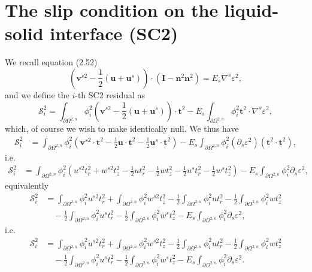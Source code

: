 \documentclass{article}
\begin{document}
\section{The slip condition on the liquid-solid interface (SC2)} %
We recall equation (2.52)
\begin{equation}
\left( \mathbf{v}^{s2} - \frac{1}{2} (\mathbf{u} + \mathbf{u}^s) \right) \cdot (\mathbf{I} - \mathbf{n}^2 \mathbf{n}^2) = E_s \nabla^s \varepsilon^2, \tag{7.1}
\end{equation}
and we define the $i$-th SC2 residual as
\begin{equation}
\mathcal{S}_i^2 = \int_{\partial \Omega^{2,n}} \phi_i^2 \left( \mathbf{v}^{s2} - \frac{1}{2} (\mathbf{u} + \mathbf{u}^s) \right) \cdot \mathbf{t}^2 - E_s \int_{\partial \Omega^{2,n}} \phi_i^2 \mathbf{t}^2 \cdot \nabla^s \varepsilon^2, \tag{7.2}
\end{equation}
which, of course we wish to make identically null.
We thus have
\begin{align}
\mathcal{S}_i^2 &= \int_{\partial \Omega^{2,n}} \phi_i^2 \left( \mathbf{v}^{s2} \cdot \mathbf{t}^2 - \frac{1}{2} \mathbf{u} \cdot \mathbf{t}^2 - \frac{1}{2} \mathbf{u}^s \cdot \mathbf{t}^2 \right) - E_s \int_{\partial \Omega^{2,n}} \phi_i^2 (\partial_s \varepsilon^2) (\mathbf{t}^2 \cdot \mathbf{t}^2), \tag{7.3}
\end{align}
i.e.
\begin{align}
\mathcal{S}_i^2 &= \int_{\partial \Omega^{2,n}} \phi_i^2 \left( u^{s2} t_r^2 + w^{s2} t_z^2 - \frac{1}{2} u t_r^2 - \frac{1}{2} w t_z^2 - \frac{1}{2} u^s t_r^2 - \frac{1}{2} w^s t_z^2 \right) - E_s \int_{\partial \Omega^{2,n}} \phi_i^2 \partial_s \varepsilon^2, \tag{7.4}
\end{align}
equivalently
\begin{align}
\mathcal{S}_i^2 &= \int_{\partial \Omega^{2,n}} \phi_i^2 u^{s2} t_r^2 + \int_{\partial \Omega^{2,n}} \phi_i^2 w^{s2} t_z^2 - \frac{1}{2} \int_{\partial \Omega^{2,n}} \phi_i^2 u t_r^2 - \frac{1}{2} \int_{\partial \Omega^{2,n}} \phi_i^2 w t_z^2 \nonumber\\
&\quad - \frac{1}{2} \int_{\partial \Omega^{2,n}} \phi_i^2 u^s t_r^2 - \frac{1}{2} \int_{\partial \Omega^{2,n}} \phi_i^2 w^s t_z^2 - E_s \int_{\partial \Omega^{2,n}} \phi_i^2 \partial_s \varepsilon^2, \tag{7.5}
\end{align}
i.e.
\begin{align}
\mathcal{S}_i^2 &= \int_{\partial \Omega^{2,n}} \phi_i^2 u^{s2} t_r^2 + \int_{\partial \Omega^{2,n}} \phi_i^2 w^{s2} t_z^2 - \frac{1}{2} \int_{\partial \Omega^{2,n}} \phi_i^2 u t_r^2 - \frac{1}{2} \int_{\partial \Omega^{2,n}} \phi_i^2 w t_z^2 \nonumber\\
&\quad - \frac{1}{2} \int_{\partial \Omega^{2,n}} \phi_i^2 u^s t_r^2 - \frac{1}{2} \int_{\partial \Omega^{2,n}} \phi_i^2 w^s t_z^2 - E_s \int_{\partial \Omega^{2,n}} \phi_i^2 \partial_s \varepsilon^2. \tag{7.6}
\end{align}
\end{document}
